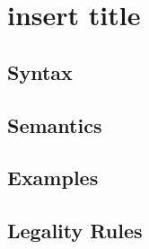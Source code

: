 \chapter{insert title} %

\section*{Syntax}

\section*{Semantics}

\section*{Examples}

\section*{Legality Rules}

\faq{}
\comments{}
\dotnetcomment{}
\javacomment{}
\ccomment{}
\pending{}
\furtherreading{}